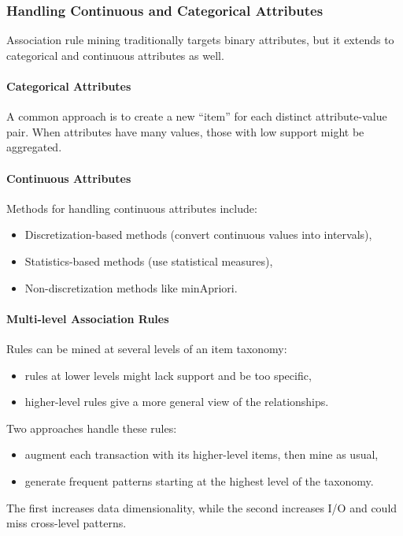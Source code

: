 \subsubsection{Handling Continuous and Categorical Attributes}
Association rule mining traditionally targets binary attributes, but it extends to categorical and continuous attributes as well.

\paragraph{Categorical Attributes} A common approach is to create a new ``item'' for each distinct attribute-value pair. When attributes have many values, those with low support might be aggregated.

\paragraph{Continuous Attributes} Methods for handling continuous attributes include:
\begin{itemize}
    \item Discretization-based methods (convert continuous values into intervals),
    \item Statistics-based methods (use statistical measures),
    \item Non-discretization methods like minApriori.
\end{itemize}

\paragraph{Multi-level Association Rules} Rules can be mined at several levels of an item taxonomy:
\begin{itemize}
    \item rules at lower levels might lack support and be too specific,
    \item higher-level rules give a more general view of the relationships.
\end{itemize}
Two approaches handle these rules:
\begin{itemize}
    \item augment each transaction with its higher-level items, then mine as usual,
    \item generate frequent patterns starting at the highest level of the taxonomy.
\end{itemize}
The first increases data dimensionality, while the second increases I/O and could miss cross-level patterns.

